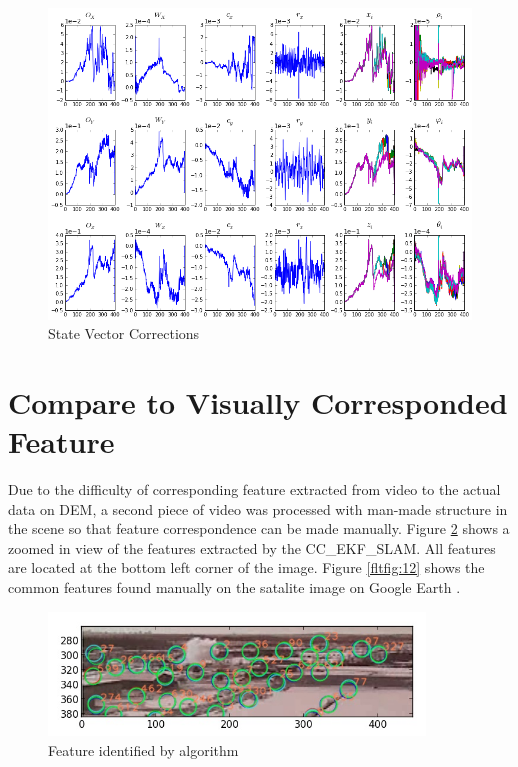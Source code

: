 \begin{figure}[h]
\centering
\includegraphics[width=12cm, keepaspectratio=true]
{./Figures/fltfig/cut1/Figure112.png}
\caption{State Vector Corrections}
\label{fltfig:4}
\end{figure}

\FloatBarrier

\section{Compare to Visually Corresponded Feature}
\label{sec:flight-manual}
Due to the difficulty of corresponding feature extracted from video to the
actual data on DEM, a second piece of video was processed with
man-made structure in the scene so that feature correspondence can be
made manually. Figure \ref{fltfig:11} shows a zoomed in view of the
features extracted by the CC\_EKF\_SLAM. All features are located at
the bottom left corner of the image. Figure \ref{fltfig:12} shows the
common features found manually on the satalite image on Google Earth
\cite{_google_????}.

\begin{figure}[h]
\centering
\includegraphics[width=10cm, keepaspectratio=true]
{./Figures/fltfig/airport/frame398_features.jpg}
\caption{Feature identified by algorithm }
\label{fltfig:11}
\end{figure}

